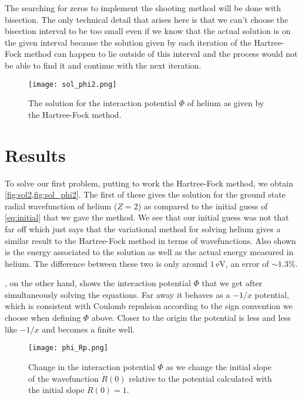 \documentclass[10pt,a4paper,twocolumn]{article}
\begin{document}
The searching for zeros to implement the shooting method will be done with bisection. The only technical detail that arises here is that we can't choose the bisection interval to be too small even if we know that the actual solution is on the given interval because the solution given by each iteration of the Hartree-Fock method can happen to lie outside of this interval and the process would not be able to find it and continue with the next iteration.

\begin{figure}
    \centering
    \texttt{[image: sol\_phi2.png]}
    \caption{The solution for the interaction potential $\Phi$ of helium as given by the Hartree-Fock method.}
    \label{fig:sol_phi2}
\end{figure}

\section{Results}

To solve our first problem, putting to work the Hartree-Fock method, we obtain \cref{fig:sol2,fig:sol_phi2}. The first of these gives the solution for the ground state radial wavefunction of helium ($Z=2$) as compared to the initial guess of \cref{eq:initial} that we gave the method. We see that our initial guess was not that far off which just says that the variational method for solving helium gives a similar result to the Hartree-Fock method in terms of wavefunctions. Also shown is the energy associated to the solution as well as the actual energy measured in helium. The difference between these two is only around $1\,\mathrm{eV}$, an error of $\sim\! 1.3\%$.

, on the other hand, shows the interaction potential $\Phi$ that we get after simultaneously solving the equations. Far away it behaves as a $-1/x$ potential, which is consistent with Coulomb repulsion according to the sign convention we choose when defining $\Phi$ above. Closer to the origin the potential is less and less like $-1/x$ and becomes a finite well.


\begin{figure}[!ht]
    \centering
    \texttt{[image: phi\_Rp.png]}
    \caption{Change in the interaction potential $\Phi$ as we change the initial slope of the wavefunction $\dot{R}(0)$ relative to the potential calculated with the initial slope $\dot{R}(0) = 1$.}
    \label{fig:phi_Rp}
\end{figure}
\end{document}
